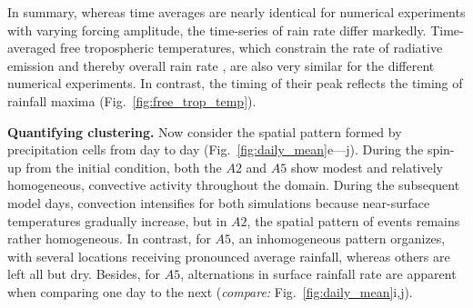 \documentclass[draft,linenumbers]{agujournal2019}
\begin{document}
In summary, whereas time averages are nearly identical for numerical experiments with varying forcing amplitude, the time-series of rain rate differ markedly.
Time-averaged free tropospheric temperatures, which constrain the rate of radiative emission and thereby overall rain rate \cite{held2006robust}, are also very similar for the different numerical experiments. 
In contrast, the timing of their peak reflects the timing of rainfall maxima (Fig.~\ref{fig:free_trop_temp}).

\noindent
{\bf Quantifying clustering.}
Now consider the spatial pattern formed by precipitation cells from day to day (Fig.~\ref{fig:daily_mean}e---j). 
During the spin-up from the initial condition, both the $A2$ and $A5$ show modest and relatively homogeneous, convective activity throughout the domain. 
During the subsequent model days, convection intensifies for both simulations because near-surface temperatures gradually increase, but in $A2$, the spatial pattern of events remains rather homogeneous.
In contrast, for $A5$, an inhomogeneous pattern organizes, with several locations receiving pronounced average rainfall, whereas others are left all but dry. 
Besides, for $A5$, alternations in surface rainfall rate are apparent when comparing one day to the next ({\it compare:} Fig.~\ref{fig:daily_mean}i,j).
\end{document}
